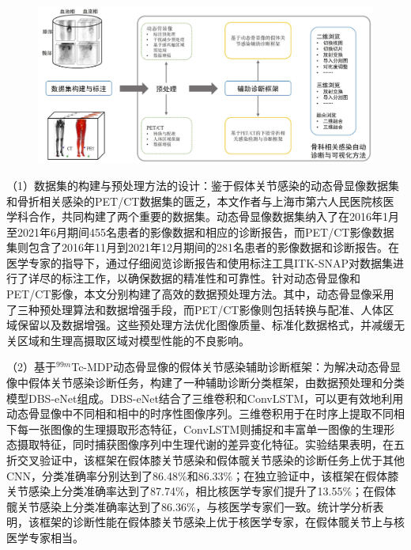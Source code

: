 \begin{figure}[htbp]
  \centering
  \includegraphics[width=\textwidth]{figures/chap01_research.jpg}
  \label{fig:chap01_research}
\end{figure}

（1）数据集的构建与预处理方法的设计：鉴于假体关节感染的动态骨显像数据集和骨折相关感染的PET/CT数据集的匮乏，本文作者与上海市第六人民医院核医学科合作，共同构建了两个重要的数据集。动态骨显像数据集纳入了在2016年1月至2021年6月期间455名患者的影像数据和相应的诊断报告，而PET/CT影像数据集则包含了2016年11月到2021年12月期间的281名患者的影像数据和诊断报告。在医学专家的指导下，通过仔细阅览诊断报告和使用标注工具ITK-SNAP对数据集进行了详尽的标注工作，以确保数据的精准性和可靠性。针对动态骨显像和PET/CT影像，本文分别构建了高效的数据预处理方法。其中，动态骨显像采用了三种预处理算法和数据增强手段，而PET/CT影像则包括转换与配准、人体区域保留以及数据增强。这些预处理方法优化图像质量、标准化数据格式，并减缓无关区域和生理高摄取区域对模型性能的不良影响。

（2）基于\(^{99m}\)Tc-MDP动态骨显像的假体关节感染辅助诊断框架：为解决动态骨显像中假体关节感染诊断任务，构建了一种辅助诊断分类框架，由数据预处理和分类模型DBS-eNet组成。DBS-eNet结合了三维卷积和ConvLSTM，可以更有效地利用动态骨显像中不同相和相中的时序性图像序列。三维卷积用于在时序上提取不同相下每一张图像的生理摄取形态特征，ConvLSTM则捕捉和丰富单一图像的生理形态摄取特征，同时捕获图像序列中生理代谢的差异变化特征。实验结果表明，在五折交叉验证中，该框架在假体膝关节感染和假体髋关节感染的诊断任务上优于其他CNN，分类准确率分别达到了86.48\%和86.33\%；在独立验证中，该框架在假体膝关节感染上分类准确率达到了87.74\%，相比核医学专家们提升了13.55\%；在假体髋关节感染上分类准确率达到了86.36\%，与核医学专家们一致。统计学分析表明，该框架的诊断性能在假体膝关节感染上优于核医学专家，在假体髋关节上与核医学专家相当。

